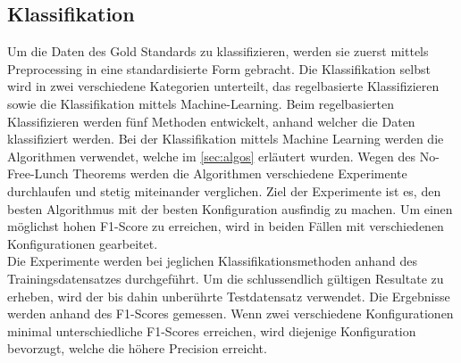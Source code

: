 \subsection{Klassifikation}
Um die Daten des Gold Standards zu klassifizieren, werden sie zuerst mittels Preprocessing in eine standardisierte Form gebracht.
Die Klassifikation selbst wird in zwei verschiedene Kategorien unterteilt, das regelbasierte Klassifizieren sowie die Klassifikation mittels Machine-Learning.
Beim regelbasierten Klassifizieren werden fünf Methoden entwickelt, anhand welcher die Daten klassifiziert werden.
Bei der Klassifikation mittels Machine Learning werden die Algorithmen verwendet, welche im \cref{sec:algos} erläutert wurden.
Wegen des \glqq No-Free-Lunch\grqq{} Theorems werden die Algorithmen verschiedene Experimente durchlaufen und stetig miteinander verglichen.
Ziel der Experimente ist es, den besten Algorithmus mit der besten Konfiguration ausfindig zu machen.
Um einen möglichst hohen F1-Score zu erreichen, wird in beiden Fällen mit verschiedenen Konfigurationen gearbeitet.\\
Die Experimente werden bei jeglichen Klassifikationsmethoden anhand des Trainingsdatensatzes durchgeführt.
Um die schlussendlich gültigen Resultate zu erheben, wird der bis dahin unberührte Testdatensatz verwendet.
Die Ergebnisse werden anhand des F1-Scores gemessen.
Wenn zwei verschiedene Konfigurationen minimal unterschiedliche F1-Scores erreichen, wird diejenige Konfiguration bevorzugt, welche die höhere Precision erreicht.
